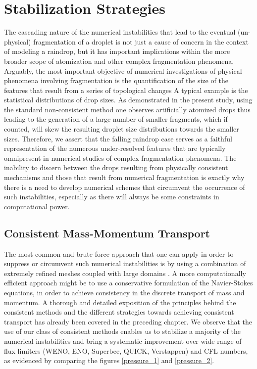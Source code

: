 \section{Stabilization Strategies}

The cascading nature of the numerical instabilities that lead to 
the eventual (un-physical) fragmentation of a droplet is not just a 
cause of concern in the context of modeling a raindrop, but it has important
implications within the more broader scope of 
atomization and other complex fragmentation phenomena. 
Arguably, the most important objective of numerical investigations of physical
phenomena involving fragmentation is the quantification of the size of 
the features that result from a series of topological changes 
A typical example is the statistical distributions of drop sizes. 
As demonstrated in the present study, using the standard non-consistent method  
one observes artificially atomized drops thus leading to the generation of a large number of 
smaller fragments, which if counted, will skew the resulting droplet size 
distributions towards the smaller sizes.
Therefore, we assert that the falling raindrop case serves as a faithful representation of the 
numerous under-resolved features that are typically omnipresent in
numerical studies of complex fragmentation phenomena.  
The inability to discern between the drops resulting from physically consistent 
mechanisms and those that result from numerical fragmentation is exactly
why there is a need to develop numerical schemes that circumvent the occurrence
of such instabilities, especially as there will always be some constraints in computational power.  


\subsection*{Consistent Mass-Momentum Transport}

The most common and brute force approach that one can apply 
in order to suppress or circumvent such numerical instabilities is 
by using a combination of extremely refined meshes coupled with large domains \cite{dodd2014}.
A more computationally efficient approach might be to use a 
conservative formulation
of the Navier-Stokes equations, in order
to achieve consistency in the discrete transport of mass and momentum. 
A thorough and detailed exposition of the principles
behind the consistent methods and the different strategies towards achieving consistent
transport has already been covered in the preceding chapter.  
We observe that the use of our class of consistent methods 
enables us to stabilize a majority of the numerical
instabilities and bring a systematic improvement over wide range of 
flux limiters (WENO, ENO, Superbee, QUICK, Verstappen) 
and CFL numbers, as evidenced by comparing the figures \ref{pressure_1} and \ref{pressure_2}. 

